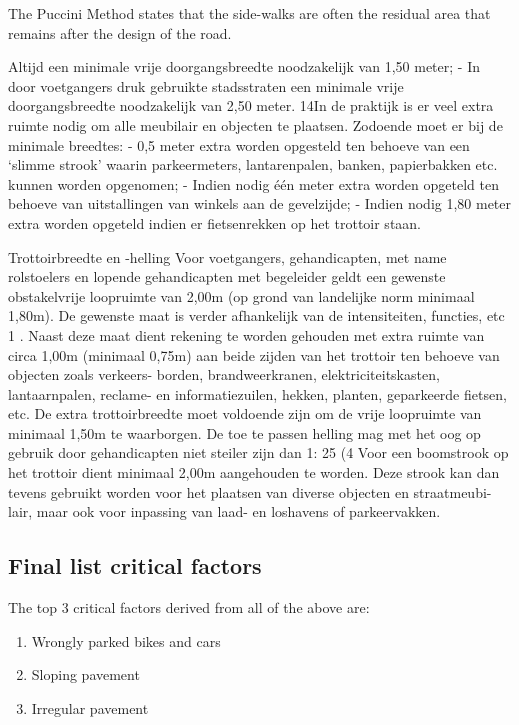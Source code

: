 The Puccini Method states that the side-walks are often the residual area that remains after the design of the road. \cite{puccini2014}

Altijd een minimale vrije doorgangsbreedte noodzakelijk van 1,50 meter;
- In door voetgangers druk gebruikte stadsstraten een minimale vrije doorgangsbreedte
noodzakelijk van 2,50 meter.
14In de praktijk is er veel extra ruimte nodig om alle meubilair en objecten te plaatsen. Zodoende moet
er bij de minimale breedtes:
- 0,5 meter extra worden opgesteld ten behoeve van een ‘slimme strook’ waarin
parkeermeters, lantarenpalen, banken, papierbakken etc. kunnen worden opgenomen;
- Indien nodig één meter extra worden opgeteld ten behoeve van uitstallingen van winkels
aan de gevelzijde;
- Indien nodig 1,80 meter extra worden opgeteld indien er fietsenrekken op het trottoir
staan.



Trottoirbreedte en -helling
Voor voetgangers, gehandicapten, met name rolstoelers en lopende gehandicapten met
begeleider geldt een gewenste obstakelvrije loopruimte van 2,00m (op grond van landelijke
norm minimaal 1,80m).
De gewenste maat is verder afhankelijk van de intensiteiten, functies, etc 1 .
Naast deze maat dient rekening te worden gehouden met extra ruimte van circa 1,00m
(minimaal 0,75m) aan beide zijden van het trottoir ten behoeve van objecten zoals verkeers-
borden, brandweerkranen, elektriciteitskasten, lantaarnpalen, reclame- en informatiezuilen,
hekken, planten, geparkeerde fietsen, etc. De extra trottoirbreedte moet voldoende zijn om de
vrije loopruimte van minimaal 1,50m te waarborgen.
De toe te passen helling mag met het oog op gebruik door gehandicapten niet steiler zijn dan
1: 25 (4%
Voor een boomstrook op het trottoir dient minimaal 2,00m aangehouden te worden. Deze
strook kan dan tevens gebruikt worden voor het plaatsen van diverse objecten en straatmeubi-
lair, maar ook voor inpassing van laad- en loshavens of parkeervakken.~\cite{leidraad2011}

\subsection{Final list critical factors}

The top 3 critical factors derived from all of the above are: 
\begin{enumerate}
\item Wrongly parked bikes and cars
\item Sloping pavement
\item Irregular pavement
\end{enumerate}

